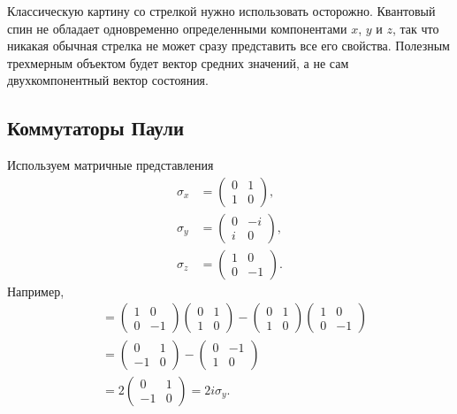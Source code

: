 Классическую картину со стрелкой нужно использовать осторожно. Квантовый спин не обладает одновременно определенными компонентами \(x\), \(y\) и \(z\), так что никакая обычная стрелка не может сразу представить все его свойства. Полезным трехмерным объектом будет вектор средних значений, а не сам двухкомпонентный вектор состояния.

\subsection{Коммутаторы Паули}

Используем матричные представления
\begin{equation}
\begin{aligned}
\sigma_x&=
\begin{pmatrix}0&1\\1&0\end{pmatrix},\\[0.4em]
\sigma_y&=
\begin{pmatrix}0&-i\\i&0\end{pmatrix},\\[0.4em]
\sigma_z&=
\begin{pmatrix}1&0\\0&-1\end{pmatrix}.
\end{aligned}
\end{equation}
Например,
\begin{align}
[\sigma_z,\sigma_x]
&=
\begin{pmatrix}1&0\\0&-1\end{pmatrix}
\begin{pmatrix}0&1\\1&0\end{pmatrix}
-
\begin{pmatrix}0&1\\1&0\end{pmatrix}
\begin{pmatrix}1&0\\0&-1\end{pmatrix}\\
&=
\begin{pmatrix}0&1\\-1&0\end{pmatrix}
-
\begin{pmatrix}0&-1\\1&0\end{pmatrix}\\
&=2
\begin{pmatrix}0&1\\-1&0\end{pmatrix}
=2i\sigma_y.
\end{align}
